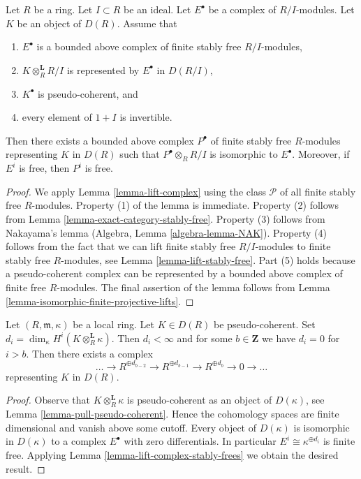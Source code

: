 \begin{lemma}
\label{lemma-lift-complex-stably-frees}
Let $R$ be a ring. Let $I \subset R$ be an ideal. Let $E^\bullet$
be a complex of $R/I$-modules. Let $K$ be an object of $D(R)$. Assume that
\begin{enumerate}
\item $E^\bullet$ is a bounded above complex of
finite stably free $R/I$-modules,
\item $K \otimes_R^\mathbf{L} R/I$ is represented by $E^\bullet$ in $D(R/I)$,
\item $K^\bullet$ is pseudo-coherent, and
\item every element of $1 + I$ is invertible.
\end{enumerate}
Then there exists a bounded above complex $P^\bullet$ of finite stably free
$R$-modules representing $K$ in $D(R)$ such that $P^\bullet \otimes_R R/I$
is isomorphic to $E^\bullet$. Moreover, if $E^i$ is free, then $P^i$ is free.
\end{lemma}

\begin{proof}
We apply Lemma \ref{lemma-lift-complex} using the class $\mathcal{P}$
of all finite stably free $R$-modules. Property (1) of the lemma is immediate.
Property (2) follows from Lemma \ref{lemma-exact-category-stably-free}.
Property (3) follows from Nakayama's lemma
(Algebra, Lemma \ref{algebra-lemma-NAK}).
Property (4) follows from the fact that we can lift finite stably free
$R/I$-modules to finite stably free $R$-modules, see
Lemma \ref{lemma-lift-stably-free}.
Part (5) holds because a pseudo-coherent complex can be represented
by a bounded above complex of finite free $R$-modules.
The final assertion of the lemma follows from
Lemma \ref{lemma-isomorphic-finite-projective-lifts}.
\end{proof}

\begin{lemma}
\label{lemma-lift-pseudo-coherent-from-residue-field}
Let $(R, \mathfrak m, \kappa)$ be a local ring. Let $K \in D(R)$
be pseudo-coherent. Set
$d_i = \dim_\kappa H^i(K \otimes_R^\mathbf{L} \kappa)$.
Then $d_i < \infty$ and for some $b \in \mathbf{Z}$ we have
$d_i = 0$ for $i > b$.
Then there exists a complex
$$
\ldots \to
R^{\oplus d_{b - 2}} \to
R^{\oplus d_{b - 1}} \to
R^{\oplus d_b} \to 0 \to \ldots
$$
representing $K$ in $D(R)$.
\end{lemma}

\begin{proof}
Observe that $K \otimes_R^\mathbf{L} \kappa$ is pseudo-coherent
as an object of $D(\kappa)$, see Lemma \ref{lemma-pull-pseudo-coherent}.
Hence the cohomology spaces are finite dimensional and vanish above
some cutoff. Every object of $D(\kappa)$ is isomorphic
in $D(\kappa)$ to a complex $E^\bullet$ with zero differentials.
In particular $E^i \cong \kappa^{\oplus d_i}$ is finite free.
Applying Lemma \ref{lemma-lift-complex-stably-frees} we obtain
the desired result.
\end{proof}

